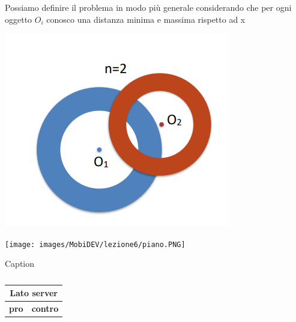 \begin{figure}[!ht]
\begin{center}
    \qquad {}
\end{center}
\end{figure}

\begin{minipage}{.4\textwidth}
   Possiamo definire il problema in modo più generale considerando che per ogni oggetto $O_i$ conosco una distanza minima e massima rispetto ad x
\end{minipage} 
\hfill
\begin{minipage}{.6\textwidth}
    \begin{center}
        \includegraphics[width=.45\textwidth]{images/Mobile computing/4. Posizione/range di distanza.PNG}
    \end{center}
\end{minipage}

\begin{center}
    \texttt{[image: images/MobiDEV/lezione6/piano.PNG]}
\end{center}

\begin{table}[!ht]
    \centering
    \begin{tabular}{p{}|p{}}
    \end{tabular}
    \caption{Caption}
    \label{tab:my_label}
\end{table}

\begin{table}[!ht]
    \centering
    \begin{tabular}{|p{}|p{}|}
        \hline
        \multicolumn{2}{|c|}{\textbf{Lato server}} \\
        \hline
        \textbf{pro} & \textbf{contro}\\
        \hline
        
        \hline
    \end{tabular}
\end{table}